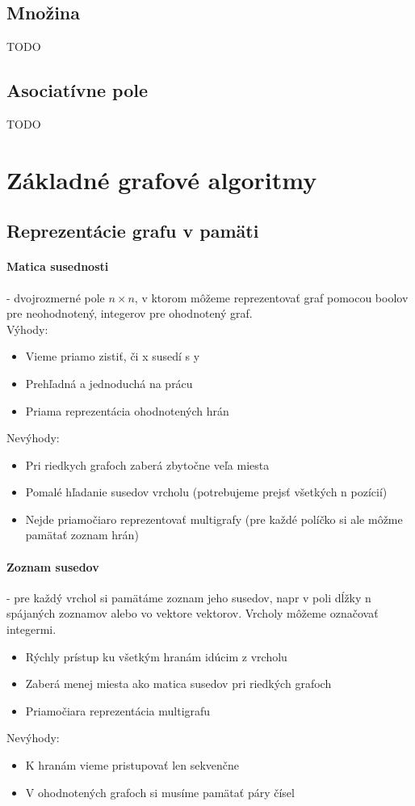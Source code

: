 	\subsection{Množina} TODO
	\subsection{Asociatívne pole} TODO

\section{Základné grafové algoritmy}

	\subsection{Reprezentácie grafu v pamäti}

		\paragraph{Matica susednosti} - dvojrozmerné pole $n \times n$, v ktorom môžeme reprezentovať graf pomocou boolov pre neohodnotený, integerov pre ohodnotený graf. \\
		Výhody:
		\begin{itemize}
			\item Vieme priamo zistiť, či x susedí s y
			\item Prehľadná a jednoduchá na prácu
			\item Priama reprezentácia ohodnotených hrán
		\end{itemize}
		Nevýhody:
		\begin{itemize}
			\item Pri riedkych grafoch zaberá zbytočne veľa miesta
			\item Pomalé hľadanie susedov vrcholu (potrebujeme prejsť všetkých n pozícií)
			\item Nejde priamočiaro reprezentovať multigrafy (pre každé políčko si ale môžme pamätať zoznam hrán)
		\end{itemize}

		\paragraph{Zoznam susedov} - pre každý vrchol si pamätáme zoznam jeho susedov, napr v poli dĺžky n spájaných zoznamov alebo vo vektore vektorov. Vrcholy môžeme označovať integermi.
		\begin{itemize}
			\item Rýchly prístup ku všetkým hranám idúcim z vrcholu
			\item Zaberá menej miesta ako matica susedov pri riedkých grafoch
			\item Priamočiara reprezentácia multigrafu
		\end{itemize}
		Nevýhody:
		\begin{itemize}
			\item K hranám vieme pristupovať len sekvenčne
			\item V ohodnotených grafoch si musíme pamätať páry čísel
		\end{itemize}


